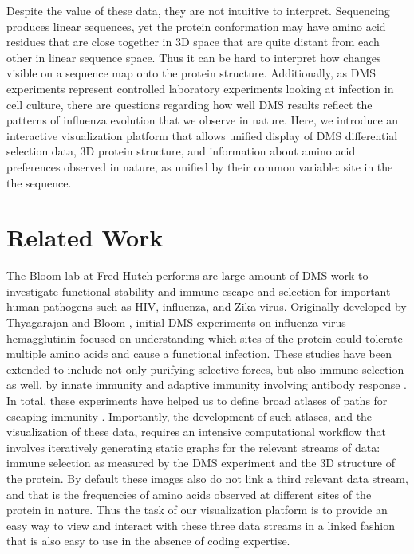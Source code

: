 \documentclass[sigchi, nonacm]{acmart}
\begin{document}
Despite the value of these data, they are not intuitive to interpret.
Sequencing produces linear sequences, yet the protein conformation may have amino acid residues that are close together in 3D space that are quite distant from each other in linear sequence space.
Thus it can be hard to interpret how changes visible on a sequence map onto the protein structure.
Additionally, as DMS experiments represent controlled laboratory experiments looking at infection in cell culture, there are questions regarding how well DMS results reflect the patterns of influenza evolution that we observe in nature.
Here, we introduce an interactive visualization platform that allows unified display of DMS differential selection data, 3D protein structure, and information about amino acid preferences observed in nature, as unified by their common variable: site in the the sequence.

\section{Related Work}

The Bloom lab at Fred Hutch performs are large amount of DMS work to investigate functional stability and immune escape and selection for important human pathogens such as HIV, influenza, and Zika virus.
Originally developed by Thyagarajan and Bloom \cite{thyagarajan2014inherent}, initial DMS experiments on influenza virus hemagglutinin focused on understanding which sites of the protein could tolerate multiple amino acids and cause a functional infection.
These studies have been extended to include not only purifying selective forces, but also immune selection as well, by innate immunity \cite{ashenberg2017deep} and adaptive immunity involving antibody response \cite{Lee2018}.
In total, these experiments have helped us to define broad atlases of paths for escaping immunity \cite{dingens2019antigenic}.
Importantly, the development of such atlases, and the visualization of these data, requires an intensive computational workflow that involves iteratively generating static graphs for the relevant streams of data: immune selection as measured by the DMS experiment and the 3D structure of the protein.
By default these images also do not link a third relevant data stream, and that is the frequencies of amino acids observed at different sites of the protein in nature.
Thus the task of our visualization platform is to provide an easy way to view and interact with these three data streams in a linked fashion that is also easy to use in the absence of coding expertise.
\end{document}
